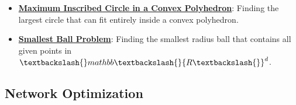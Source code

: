 \documentclass{article}%
\begin{document}
\begin{itemize}[leftmargin=*]
\item \href{https://www.math.purdue.edu/~yipn/421/2024-10-22-Regression.pdf#page=15}{\textbf{Maximum Inscribed Circle in a Convex Polyhedron}}: Finding the largest circle that can fit entirely inside a convex polyhedron.%
\item \href{https://www.math.purdue.edu/~yipn/421/2024-10-22-Regression.pdf#page=22}{\textbf{Smallest Ball Problem}}: Finding the smallest radius ball that contains all given points in $\textbackslash{}mathbb\textbackslash{}{R\textbackslash{}}^d$.%
\end{itemize}

%
\subsection{Network Optimization}%
\label{subsec:NetworkOptimization}%
\end{document}
